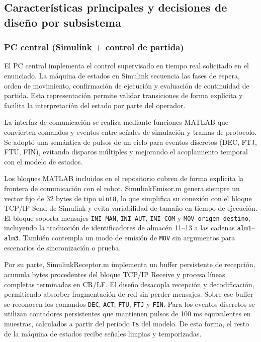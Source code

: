 \documentclass[12pt,a4paper]{article}
\begin{document}
\subsection{Caracter\'isticas principales y decisiones de dise\~no por subsistema}

\subsubsection{PC central (Simulink + control de partida)}
El PC central implementa el control supervisado en tiempo real solicitado en el enunciado. La m\'aquina de estados en Simulink secuencia las fases de espera, orden de movimiento, confirmaci\'on de ejecuci\'on y evaluaci\'on de continuidad de partida. Esta representaci\'on permite validar transiciones de forma expl\'icita y facilita la interpretaci\'on del estado por parte del operador.
\par
La interfaz de comunicaci\'on se realiza mediante funciones MATLAB que convierten comandos y eventos entre se\~nales de simulaci\'on y tramas de protocolo. Se adopt\'o una sem\'antica de pulsos de un ciclo para eventos discretos (DEC, FTJ, FTU, FIN), evitando disparos m\'ultiples y mejorando el acoplamiento temporal con el modelo de estados.

Los bloques MATLAB incluidos en el repositorio cubren de forma expl\'icita la frontera de comunicaci\'on con el robot. SimulinkEmisor.m genera siempre un vector fijo de 32 bytes de tipo \texttt{uint8}, lo que simplifica su conexi\'on con el bloque TCP/IP Send de Simulink y evita variabilidad de tama\~no en tiempo de ejecuci\'on. El bloque soporta mensajes \texttt{INI MAN}, \texttt{INI AUT}, \texttt{INI COM} y \texttt{MOV origen destino}, incluyendo la traducci\'on de identificadores de almac\'en 11--13 a las cadenas \texttt{alm1}--\texttt{alm3}. Tambi\'en contempla un modo de emisi\'on de \texttt{MOV} sin argumentos para escenarios de sincronizaci\'on o prueba.

Por su parte, SimulinkReceptor.m implementa un buffer persistente de recepci\'on, acumula bytes procedentes del bloque TCP/IP Receive y procesa l\'ineas completas terminadas en CR/LF. El dise\~no desacopla recepci\'on y decodificaci\'on, permitiendo absorber fragmentaci\'on de red sin perder mensajes. Sobre ese buffer se reconocen los comandos \texttt{DEC}, \texttt{ACT}, \texttt{FTU}, \texttt{FTJ} y \texttt{FIN}. Para los eventos discretos se utilizan contadores persistentes que mantienen pulsos de 100 ms equivalentes en muestras, calculados a partir del periodo \texttt{Ts} del modelo. De esta forma, el resto de la m\'aquina de estados recibe se\~nales limpias y temporizadas.
\end{document}
